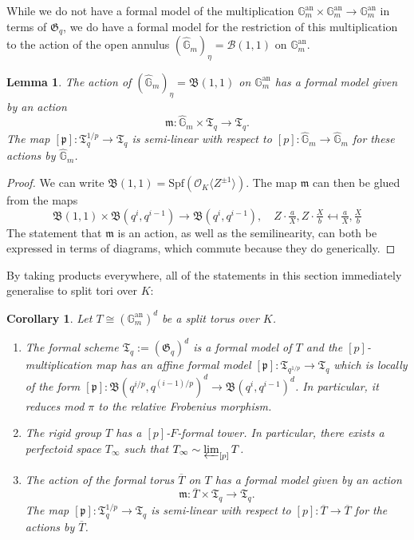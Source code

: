 \documentclass[10pt,oneside]{amsart}
\newtheorem{lemma}[theorem]{Lemma}
\newtheorem{corollary}[theorem]{Corollary}
\theoremstyle{definition}
\begin{document}
		
	While we do not have a formal model of the multiplication $\mathbb G_m^{\operatorname{an}}\times \mathbb G_m^{\operatorname{an}}\rightarrow \mathbb G_m^{\operatorname{an}}$ in terms of $\mathfrak G_q$, we do have a formal model for the restriction of this multiplication to the action of the open annulus $(\hat{\mathbb G}_m)_{\eta}=\mathcal B(1,1)$ on $\mathbb G_m^{\operatorname{an}}$.
	
	\begin{lemma}\label{action on formal model of torus}
		The action of $(\hat{\mathbb G}_m)_{\eta}=\mathfrak B(1,1)$ on $\mathbb G_m^{\mathrm{an}}$ has a formal model given by an action
		\[\mathfrak m:\hat{\mathbb G}_m\times \mathfrak T_q\rightarrow \mathfrak T_q.\]
		The map $[\mathfrak p]:\mathfrak T_q^{1/p}\rightarrow \mathfrak T_q$ is semi-linear with respect to $[p]:\hat{\mathbb G}_m\rightarrow \hat{\mathbb G}_m$ for these actions by $\hat{\mathbb G}_m$.
	\end{lemma} 
	\begin{proof}
		We can write $\mathfrak B(1,1)=\mathrm{Spf}(\mathcal O_K\langle Z^{\pm 1}\rangle)$.
		The map $\mathfrak m$ can then be glued from the maps
		\[\mathfrak B(1,1)\times \mathfrak B(q^i,q^{i-1})\to \mathfrak B(q^i,q^{i-1}),\quad Z\cdot \tfrac{a}{X},Z\cdot \tfrac{X}{b} \mapsfrom \tfrac{a}{X},\tfrac{X}{b} \]
		The statement that $\mathfrak m$ is an action, as well as the semilinearity, can both be expressed in terms of diagrams, which commute because they do generically.
	\end{proof}
	


	
	By taking products everywhere, all of the statements in this section immediately generalise to split tori over $K$: 
	\begin{corollary}\label{torus has formal models}\label{torus has p-F-formal tower and has perfectoid tilde-limit}\label{action on formal model of torus, case of general tori}
		Let $T\cong(\mathbb G_m^{\operatorname{an}})^d$ be a split torus over $K$.
		\begin{enumerate}
		\item The formal scheme $\mathfrak T_q := (\mathfrak G_q)^d$ is a formal model of $T$ and the $[p]$-multiplication map has an affine formal model $[\mathfrak p]:\mathfrak T_{q^{1/p}}\rightarrow \mathfrak T_{q}$ which is locally of the form $[\mathfrak p]: \mathfrak B(q^{i/p},q^{(i-1)/p})^d\rightarrow \mathfrak B(q^{i},q^{i-1})^d$. In particular, it reduces mod $\pi$ to the relative Frobenius morphism.
	\item	The rigid group $T$ has a $[p]$-$F$-formal tower. In particular, there exists a perfectoid space $T_\infty$ such that $T_\infty \sim \varprojlim_{[p]} T$. 
	\item 	The action of the formal torus $\overline{T}$ on $T$ has a formal model given by an action
		\[\mathfrak m:\overline{T}\times \mathfrak T_q\rightarrow \mathfrak T_q.\]
		The map $[\mathfrak p]:\mathfrak T_q^{1/p}\rightarrow \mathfrak T_q$ is semi-linear with respect to $[p]:\overline{T}\rightarrow \overline{T}$ for the actions by $\overline{T}$.
	\end{enumerate}
	\end{corollary}  
	
\end{document}
